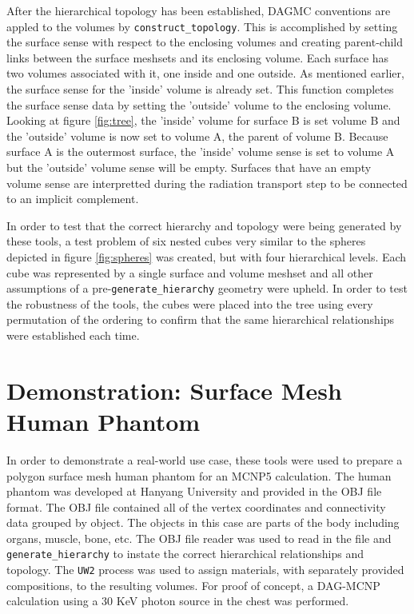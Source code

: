 \documentclass{anstrans}
\begin{document}
After the hierarchical topology has been established, DAGMC conventions are
appled to the volumes by \texttt{construct\_topology}.  This is accomplished
by setting the surface sense with respect to the enclosing volumes and
creating parent-child links between the surface meshsets and its enclosing
volume.  Each surface has two volumes associated with it, one inside and one
outside.  As mentioned earlier, the surface sense for the 'inside' volume is
already set.  This function completes the surface sense data by setting the
'outside' volume to the enclosing volume.  Looking at figure \ref{fig:tree},
the 'inside' volume for surface B is set volume B and the 'outside' volume is
now set to volume A, the parent of volume B.  Because surface A is the
outermost surface, the 'inside' volume sense is set to volume A but the
'outside' volume sense will be empty.  Surfaces that have an empty volume
sense are interpretted during the radiation transport step to be connected to
an implicit complement.

In order to test that the correct hierarchy and topology were being generated
by these tools, a test problem of six nested cubes very similar to the spheres
depicted in figure \ref{fig:spheres} was created, but with four hierarchical
levels.  Each cube was represented by a single surface and volume meshset and
all other assumptions of a pre-\texttt{generate\_hierarchy} geometry were
upheld.  In order to test the robustness of the tools, the cubes were placed
into the tree using every permutation of the ordering to confirm that the same
hierarchical relationships were established each time.

\section{Demonstration: Surface Mesh Human Phantom}

In order to demonstrate a real-world use case, these tools were used to
prepare a polygon surface mesh human phantom for an MCNP5 calculation.  The
human phantom was developed at Hanyang University and provided in the OBJ file
format. \cite{phantom} The OBJ file contained all of the vertex coordinates
and connectivity data grouped by object.  The objects in this case are parts
of the body including organs, muscle, bone, etc.  The OBJ file reader was used
to read in the file and \texttt{generate\_hierarchy} to instate the correct
hierarchical relationships and topology.  The \texttt{UW2} process was used to
assign materials, with separately provided compositions, to the resulting
volumes.  For proof of concept, a DAG-MCNP calculation using a 30 KeV photon
source in the chest was performed.
\end{document}
